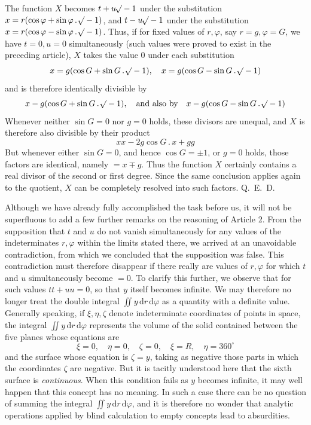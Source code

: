 The function $X$ becomes $t+u\mathord{{}^{}\!\surd}-1$ under the substitution $x=r(\cos\varphi+\sin\varphi\, .\,\mathord{{}^{}\!\surd}-1)$, and $t-u\mathord{{}^{}\!\surd}-1$ under the substitution $x=r(\cos\varphi-\sin\varphi\, .\,\mathord{{}^{}\!\surd}-1)$. Thus, if for fixed values of $r,\varphi$, say $r=g,\varphi=G$, we have $t=0,u=0$ simultaneously (such values were proved to exist in the preceding article), $X$ takes the value 0 under each substitution
\[
x=g(\cos G+\sin G\, .\,\mathord{{}^{}\!\surd}-1),\quad x=g(\cos G-\sin G\, .\,\mathord{{}^{}\!\surd}-1)
\]
and is therefore identically divisible by
\[
x-g(\cos G+\sin G\, .\,\mathord{{}^{}\!\surd}-1),\quad\text{and also by}\quad x-g(\cos G-\sin G\, .\,\mathord{{}^{}\!\surd}-1)
\]
Whenever neither $\sin G=0$ nor $g=0$ holds, these divisors are unequal, and $X$ is therefore also divisible by their product
\[
xx-2g\cos G\, .\,x+gg
\]
But whenever either $\sin G=0$, and hence $\cos G=\pm1$, or $g=0$ holds, those factors are identical, namely $=x\mp g$. Thus the function $X$ certainly contains a real divisor of the second or first degree. Since the same conclusion applies again to the quotient, $X$ can be completely resolved into such factors. Q.~E.~D.

Although we have already fully accomplished the task before us, it will not be superfluous to add a few further remarks on the reasoning of Article 2. From the supposition that $t$ and $u$ do not vanish simultaneously for any values of the indeterminates $r,\varphi$ within the limits stated there, we arrived at an unavoidable contradiction, from which we concluded that the supposition was false. This contradiction must therefore disappear if there really are values of $r,\varphi$ for which $t$ and $u$ simultaneously become $=0$. To clarify this further, we observe that for such values $tt+uu=0$, so that $y$ itself becomes infinite. We may therefore no longer treat the double integral $\iint y\,\mathrm dr\,\mathrm d\varphi$ as a quantity with a definite value. Generally speaking, if $\xi,\eta,\zeta$ denote indeterminate coordinates of points in space, the integral $\iint y\,\mathrm dr\,\mathrm d\varphi$ represents the volume of the solid contained between the five planes whose equations are
\[
\xi=0,\quad\eta=0,\quad\zeta=0,\quad\xi=R,\quad\eta=360^\circ
\]
and the surface whose equation is $\zeta=y$, taking as negative those parts in which the coordinates $\zeta$ are negative. But it is tacitly understood here that the sixth surface is \textit{continuous}. When this condition fails as $y$ becomes infinite, it may well happen that this concept has no meaning. In such a case there can be no question of summing the integral $\iint y\,\mathrm dr\,\mathrm d\varphi$, and it is therefore no wonder that analytic operations applied by blind calculation to empty concepts lead to absurdities.

